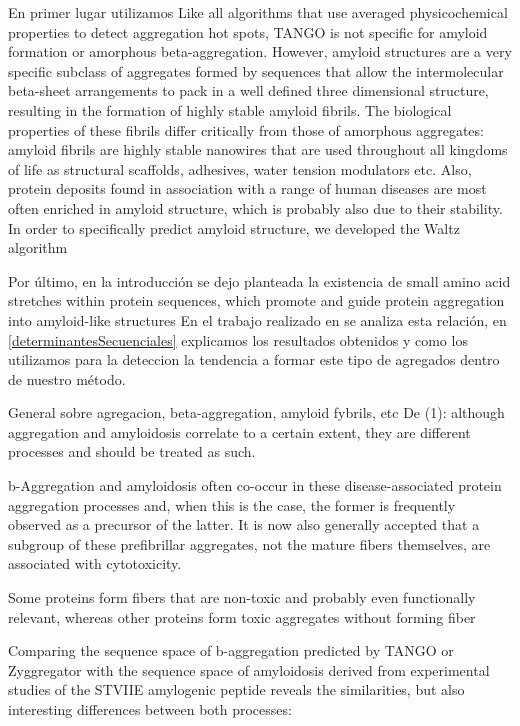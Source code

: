 En primer lugar utilizamos 
Like all algorithms that use averaged physicochemical properties to detect aggregation hot spots, TANGO is not specific for amyloid formation or amorphous beta-aggregation. 
However, amyloid structures are a very specific subclass of aggregates formed by sequences that allow the intermolecular beta-sheet arrangements to pack in a well defined three dimensional structure,
resulting in the formation of highly stable amyloid fibrils.
The biological properties of these fibrils differ critically from those of amorphous aggregates: amyloid fibrils are highly stable nanowires that are used throughout all kingdoms of life as structural scaffolds, 
adhesives, water tension modulators etc. 
Also, protein deposits found in association with a range of human diseases are most often enriched in amyloid structure, which is probably also due to their stability. 
In order to specifically predict amyloid structure, we developed the Waltz algorithm


Por último, en la introducción se dejo planteada la existencia de 
small amino acid stretches within protein sequences, which
promote and guide protein aggregation into amyloid-like structures
En el trabajo realizado en \cite{de2004sequence} se analiza esta relación, 
en \ref{determinantesSecuenciales} explicamos los resultados obtenidos y como los utilizamos para la deteccion la tendencia a formar este tipo de agregados dentro de nuestro método.






General sobre agregacion, beta-aggregation, amyloid fybrils, etc
De (1): although aggregation and amyloidosis correlate to a certain extent, they are different processes and should be treated as such.

b-Aggregation and amyloidosis often co-occur in these disease-associated protein aggregation processes and, when this is the case, the former is frequently observed as a precursor of the latter. 
It is now also generally accepted that a subgroup of these prefibrillar aggregates, not the mature fibers themselves, are associated with cytotoxicity.

Some proteins form fibers that are non-toxic and probably even functionally relevant, whereas other proteins form toxic aggregates without forming fiber

Comparing the sequence space of b-aggregation predicted by TANGO or Zyggregator with the sequence space of amyloidosis derived from experimental studies of the STVIIE amylogenic peptide reveals the similarities, 
but also interesting differences between both processes:

